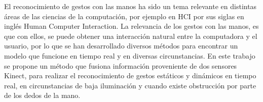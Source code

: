
El reconocimiento de gestos con las manos ha sido un tema relevante en distintas áreas de las ciencias de la computación, por ejemplo en HCI por sus siglas en inglés Human Computer Interaction. La relevancia de los gestos con las manos, es que con ellos, se puede obtener una interacción natural entre la computadora y el usuario, por lo que se han desarrollado diversos m\'etodos para encontrar un modelo que funcione en tiempo real y en diversas circunstancias. En este trabajo se propone un método que fusiona información proveniente de dos sensores Kinect, para realizar el reconocimiento de gestos estáticos y dinámicos en tiempo real, en circunstancias de baja iluminación y cuando existe obstrucción por parte de los dedos de la mano.